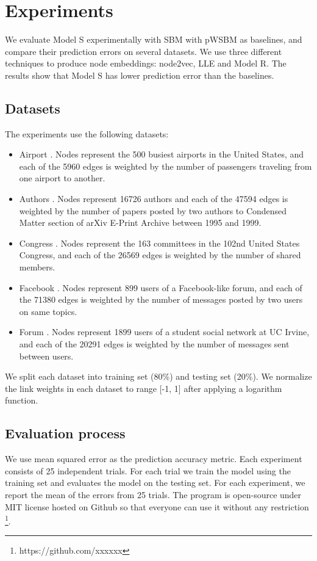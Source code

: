 \documentclass{article} %
\begin{document}
\section{Experiments} \label{section:experiments}
We evaluate Model S experimentally with SBM with pWSBM as baselines,
and compare their prediction errors on several datasets.
We use three different techniques to produce node embeddings: node2vec, LLE and Model R.
The results show 
that Model S has lower prediction error than the baselines.

\subsection{Datasets}
The experiments use the following datasets:
\begin{itemize}
	\item Airport \citep{colizza2007reaction}. Nodes represent the 500 busiest airports in the United States, and each of the 5960 edges is weighted by the number of passengers traveling from one airport to another.
	\item Authors \citep{newman2001structure}. Nodes represent 16726 authors and each of the 47594 edges is weighted by the number of papers posted by two authors to Condensed Matter section of arXiv E-Print Archive between 1995 and 1999.
	\item Congress \citep{porter2005network}. Nodes represent the 163 committees in the 102nd United States Congress, and each of the 26569 edges is weighted by the number of shared members.
	\item Facebook \citep{opsahl2013triadic}. Nodes represent 899 users of a Facebook-like forum, and each of the 71380 edges is weighted by the number of messages posted by two users on same topics.
	\item Forum \citep{opsahl2009clustering}. Nodes represent 1899 users of a student social network at UC Irvine, and each of the 20291 edges is weighted by the number of messages sent between users.
\end{itemize}
We split each dataset into training set (80\%) and testing set (20\%).
We normalize the link weights in each dataset to range [-1, 1] after applying a logarithm function.

\subsection{Evaluation process}
We use mean squared error as the prediction accuracy metric.
Each experiment consists of 25 independent trials.
For each trial we train the model using the training set and evaluates the model on the testing set.
For each experiment, we report the mean of the errors from 25 trials.
The program is open-source under MIT license hosted on Github
so that everyone can use it without any restriction
\footnote{https://github.com/xxxxxx}.
\end{document}
